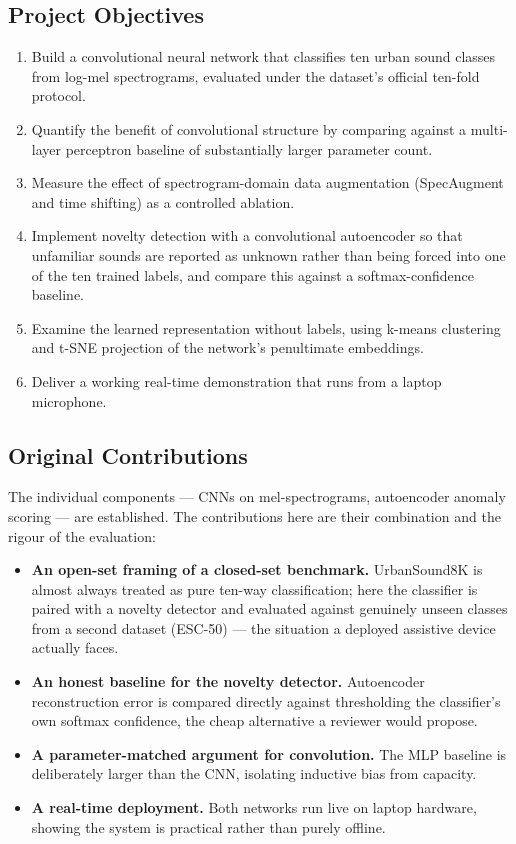 \documentclass[11pt, a4paper]{article}
\begin{document}
\subsection{Project Objectives}

\begin{enumerate}[leftmargin=2.2em]
    \item Build a convolutional neural network that classifies ten urban sound classes from log-mel spectrograms, evaluated under the dataset's official ten-fold protocol.
    \item Quantify the benefit of convolutional structure by comparing against a multi-layer perceptron baseline of substantially larger parameter count.
    \item Measure the effect of spectrogram-domain data augmentation (SpecAugment and time shifting) as a controlled ablation.
    \item Implement novelty detection with a convolutional autoencoder so that unfamiliar sounds are reported as unknown rather than being forced into one of the ten trained labels, and compare this against a softmax-confidence baseline.
    \item Examine the learned representation without labels, using k-means clustering and t-SNE projection of the network's penultimate embeddings.
    \item Deliver a working real-time demonstration that runs from a laptop microphone.
\end{enumerate}

\subsection{Original Contributions}

The individual components --- CNNs on mel-spectrograms, autoencoder anomaly scoring --- are established. The contributions here are their combination and the rigour of the evaluation:

\begin{itemize}[leftmargin=2.2em]
    \item \textbf{An open-set framing of a closed-set benchmark.} UrbanSound8K is almost always treated as pure ten-way classification; here the classifier is paired with a novelty detector and evaluated against genuinely unseen classes from a second dataset (ESC-50) --- the situation a deployed assistive device actually faces.
    \item \textbf{An honest baseline for the novelty detector.} Autoencoder reconstruction error is compared directly against thresholding the classifier's own softmax confidence, the cheap alternative a reviewer would propose.
    \item \textbf{A parameter-matched argument for convolution.} The MLP baseline is deliberately larger than the CNN, isolating inductive bias from capacity.
    \item \textbf{A real-time deployment.} Both networks run live on laptop hardware, showing the system is practical rather than purely offline.
\end{itemize}
\end{document}
